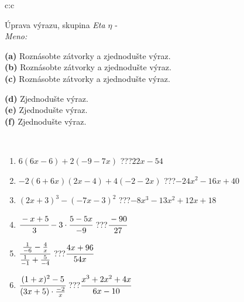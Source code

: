 \documentclass[10pt]{report}
\begin{document}
\newpage
\thispagestyle{empty}
\begin{tabular}{c:c}
\begin{minipage}[c][104.5mm][t]{0.5\linewidth}
\begin{center}
\vspace{7mm}
{\huge Úprava výrazu, skupina \textit{Eta $\eta$} -}\\[5mm]
\textit{Meno:}\phantom{xxxxxxxxxxxxxxxxxxxxxxxxxxxxxxxxxxxxxxxxxxxxxxxxxxxxxxxxxxxxxxxxx}\\[5mm]
\begin{minipage}{0.95\linewidth}
\begin{center}
{\small \begin{minipage}{0.6\textwidth}
\textbf{(a)} Roznásobte zátvorky a zjednodušte výraz. \\[1mm]
\textbf{(b)} Roznásobte zátvorky a zjednodušte výraz. \\[1mm]
\textbf{(c)} Roznásobte zátvorky a zjednodušte výraz.
\end{minipage} \begin{minipage}{0.39\textwidth}
\textbf{(d)} Zjednodušte výraz. \\[1mm]
\textbf{(e)} Zjednodušte výraz. \\[1mm]
\textbf{(f)} Zjednodušte výraz.
\end{minipage}
}
\end{center}
\end{minipage}
\\[4mm]
\begin{minipage}{0.79\linewidth}
\begin{center}
\begin{varwidth}{\linewidth}
\begin{enumerate}
\normalsize
\item $6(6x-6)+2(-9-7x)$\quad \dotfill\; ???\;\dotfill \quad $22x-54$
\item $-2(6+6x)(2x-4)+4(-2-2x)$\quad \dotfill\; ???\;\dotfill \quad $-24x^2-16x+40$
\item $(2x+3)^3-(-7x-3)^2$\quad \dotfill\; ???\;\dotfill \quad $-8x^3-13x^2+12x+18$
\item $\cfrac{-x+5}{3}-3\cdot\cfrac{5-5x}{-9}$\quad \dotfill\; ???\;\dotfill \quad $\cfrac{-90}{27}$
\item $\cfrac{\frac{1}{-6}-\frac{4}{x}}{\frac{1}{-1}+\frac{5}{-4}}$\quad \dotfill\; ???\;\dotfill \quad $\cfrac{4x+96}{54x}$
\item $\cfrac{(1+x)^2-5}{(3x+5)\cdot\frac{-2}{x}}$\quad \dotfill\; ???\;\dotfill \quad $\cfrac{x^3+2x^2+4x}{6x-10}$

\end{enumerate}
\end{varwidth}
\end{center}
\end{minipage}
\end{center}
\end{minipage}
\end{tabular}
\end{document}
